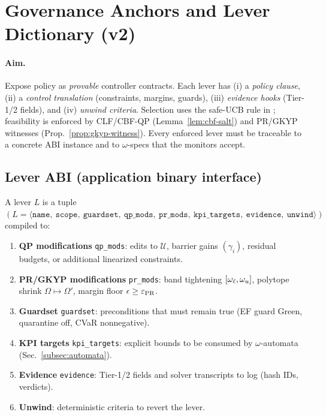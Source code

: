 \section{Governance Anchors and Lever Dictionary (v2)}\label{sec:gov-v2}

\paragraph{Aim.}
Expose policy as \emph{provable} controller contracts. Each lever has (i) a \emph{policy clause}, (ii) a \emph{control translation} (constraints, margins, guards), (iii) \emph{evidence hooks} (Tier-1/2 fields), and (iv) \emph{unwind criteria}. Selection uses the safe-UCB rule in ; feasibility is enforced by CLF/CBF-QP (Lemma~\ref{lem:cbf-salt}) and PR/GKYP witnesses (Prop.~\ref{prop:gkyp-witness}). Every enforced lever must be traceable to a concrete ABI instance and to $\omega$-specs that the monitors accept.

\subsection{Lever ABI (application binary interface)}\label{subsec:lever-abi}
\emph{}

\begin{definition}\label{def:lever-abi}
A lever $L$ is a tuple
$(
L=\langle\texttt{name},\ \texttt{scope},\ \texttt{guardset},\ \texttt{qp\_mods},\ \texttt{pr\_mods},\ \texttt{kpi\_targets},\ \texttt{evidence},\ \texttt{unwind}\rangle
)$
compiled to:
\begin{enumerate}[leftmargin=*]
\item \textbf{QP modifications} \texttt{qp\_mods}: edits to $\mathcal U$, barrier gains $(\gamma_i)$, residual budgets, or additional linearized constraints.
\item \textbf{PR/GKYP modifications} \texttt{pr\_mods}: band tightening $[\omega_{\ell},\omega_{u}]$, polytope shrink $\Omega\mapsto\Omega'$, margin floor $\epsilon\ge \varepsilon_{\mathrm{PR}}$.
\item \textbf{Guardset} \texttt{guardset}: preconditions that must remain true (EF guard Green, quarantine off, CVaR nonnegative).
\item \textbf{KPI targets} \texttt{kpi\_targets}: explicit bounds to be consumed by $\omega$-automata (Sec.~\ref{subsec:automata}).
\item \textbf{Evidence} \texttt{evidence}: Tier-1/2 fields and solver transcripts to log (hash IDs, verdicts).
\item \textbf{Unwind}: deterministic criteria to revert the lever.
\end{enumerate}
\end{definition}

